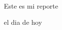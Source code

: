\documentclass{article}
\begin{document}
    Este es mi reporte
    
    el dia de hoy
    \begin{figure}
        
    \end{figure}
\end{document}
